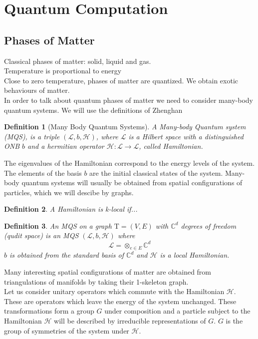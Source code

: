 \documentclass{article}
\newtheorem{definition}{Definition}
\newcommand{\Tau}{\mathrm{T}}
\begin{document}
\section{Quantum Computation}

\subsection{Phases of Matter}
Classical phases of matter: solid, liquid and gas.\\
Temperature is proportional to energy \\
Close to zero temperature, phases of matter are quantized. We obtain exotic behaviours of matter.\\
In order to talk about quantum phases of matter we need to consider many-body quantum systems. We will use the definitions of Zhenghan

\begin{definition}[Many Body Quantum Systems]
A Many-body Quantum system (MQS), is a triple $(\mathcal{L}, b, \mathcal{H})$, where $\mathcal{L}$ is a Hilbert space with a distinguished ONB $b$ and a hermitian operator $\mathcal{H}: \mathcal{L} \rightarrow \mathcal{L}$, called Hamiltonian.
\end{definition}
The eigenvalues of the Hamiltonian correspond to the energy levels of the system. The elements of the basis $b$ are the initial classical states of the system. Many-body quantum systems will usually be obtained from spatial configurations of particles, which we will descibe by graphs.
\begin{definition}
A Hamiltonian is k-local if...
\end{definition}

\begin{definition}
An MQS on a graph $\Tau = (V,E)$ with $\mathbb{C}^d$ degrees of freedom (qudit space) is an MQS $(\mathcal{L},b, \mathcal{H})$ where
$$ \mathcal{L} = \otimes_{e\in E} \mathbb{C}^d$$
$b$ is obtained from the standard basis of $\mathbb{C}^d$ and $\mathcal{H}$ is a local Hamiltonian.
\end{definition}
Many interesting spatial configurations of matter are obtained from triangulations of manifolds by taking their 1-skeleton graph.\\
Let us consider unitary operators which commute with the Hamiltonian $\mathcal{H}$. These are operators which leave the energy of the system unchanged. These transformations form a group $G$ under composition and a particle subject to the Hamiltonian $\mathcal{H}$ will be described by irreducible representations of $G$. $G$ is the group of symmetries of the system under $\mathcal{H}$.
\end{document}

